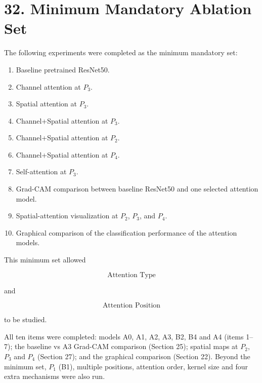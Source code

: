 \documentclass[10pt]{article}
\begin{document}
\section*{32. Minimum Mandatory Ablation Set}

The following experiments were completed as the minimum mandatory set:

\begin{enumerate}

\item Baseline pretrained ResNet50.

\item Channel attention at $P_3$.

\item Spatial attention at $P_3$.

\item Channel+Spatial attention at $P_3$.

\item Channel+Spatial attention at $P_2$.

\item Channel+Spatial attention at $P_4$.

\item Self-attention at $P_3$.

\item Grad-CAM comparison between baseline ResNet50 and one selected
attention model.

\item Spatial-attention visualization at $P_2$, $P_3$, and $P_4$.

\item Graphical comparison of the classification performance of the attention
models.

\end{enumerate}

This minimum set allowed

\[
\boxed{\text{Attention Type}}
\]

and

\[
\boxed{\text{Attention Position}}
\]

to be studied.

All ten items were completed: models A0, A1, A2, A3, B2, B4 and A4 (items 1--7);
the baseline vs A3 Grad-CAM comparison (Section 25); spatial maps at $P_2$, $P_3$
and $P_4$ (Section 27); and the graphical comparison (Section 22). Beyond the
minimum set, $P_1$ (B1), multiple positions, attention order, kernel size and
four extra mechanisms were also run.
\end{document}
